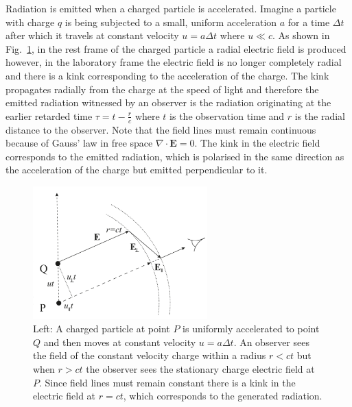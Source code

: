 \documentclass[../main.tex]{subfiles}
\begin{document}
Radiation is emitted when a charged particle is accelerated. Imagine a particle with charge $q$ is being subjected to a small, uniform acceleration $a$ for a time $\Delta t$ after which it travels at constant velocity $u=a\Delta t$ where $u\ll c$. As shown in Fig.~\ref{fig:e_field_diagram}, in the rest frame of the charged particle a radial electric field is produced however, in the laboratory frame the electric field is no longer completely radial and there is a kink corresponding to the acceleration of the charge. The kink propagates radially from the charge at the speed of light and therefore the emitted radiation witnessed by an observer is the radiation originating at the earlier retarded time $\tau=t-\frac{r}{c}$ where $t$ is the observation time and $r$ is the radial distance to the observer. Note that the field lines must remain continuous because of Gauss' law in free space $\nabla\cdot\boldsymbol{E}=0$. The kink in the electric field corresponds to the emitted radiation, which is polarised in the same direction as the acceleration of the charge but emitted perpendicular to it. 
\begin{figure}[!h]
\centering
\includegraphics[width=0.6\textwidth]{Figures/Photon_Production_by_Inverse_Compton_Scattering/E_field_diagram.pdf}
\caption{Left: A charged particle at point $P$ is uniformly accelerated to point $Q$ and then moves at constant velocity $u=a\Delta t$. An observer sees the field of the constant velocity charge within a radius $r < ct$ but when $r > ct$ the observer sees the stationary charge electric field at $P$. Since field lines must remain constant there is a kink in the electric field at $r=ct$, which corresponds to the generated radiation. }
\label{fig:e_field_diagram}
\end{figure}
\end{document}
